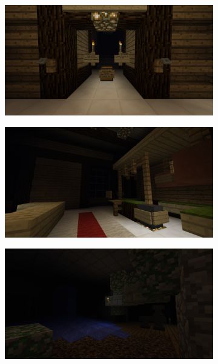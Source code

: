 \documentclass[12pt,a4paper]{article}\usepackage[]{graphicx}\usepackage[]{color}
\begin{document}
\begin{figure}[htb]
	\centering
	\begin{subfigure}[t]{.495\linewidth}
		\centering
		\includegraphics[width=\textwidth]{images/environment1.png}
	\end{subfigure}
	\begin{subfigure}[t]{.495\linewidth}
		\centering
		\includegraphics[width=\textwidth]{images/environment2.png}
	\end{subfigure}
	\begin{subfigure}[t]{.495\linewidth}
		\centering
		\includegraphics[width=\textwidth]{images/environment3.png}

\end{subfigure}
\end{figure}
\end{document}
